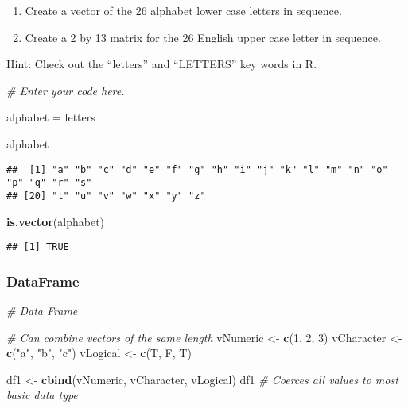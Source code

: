 \documentclass[
]{article}
\newenvironment{Shaded}{\begin{snugshade}}{\end{snugshade}}
\newcommand{\CommentTok}[1]{\textcolor[rgb]{0.56,0.35,0.01}{\textit{#1}}}
\newcommand{\DecValTok}[1]{\textcolor[rgb]{0.00,0.00,0.81}{#1}}
\newcommand{\FunctionTok}[1]{\textcolor[rgb]{0.13,0.29,0.53}{\textbf{#1}}}
\newcommand{\NormalTok}[1]{#1}
\newcommand{\OtherTok}[1]{\textcolor[rgb]{0.56,0.35,0.01}{#1}}
\newcommand{\StringTok}[1]{\textcolor[rgb]{0.31,0.60,0.02}{#1}}
\providecommand{\tightlist}{%
  \setlength{\itemsep}{0pt}\setlength{\parskip}{0pt}}
\begin{document}
\begin{enumerate}
\def\labelenumi{\arabic{enumi}.}
\tightlist
\item
  Create a vector of the 26 alphabet lower case letters in sequence.
\item
  Create a 2 by 13 matrix for the 26 English upper case letter in
  sequence.
\end{enumerate}

Hint: Check out the ``letters'' and ``LETTERS'' key words in R.

\begin{Shaded}
\begin{Highlighting}[]
\CommentTok{\# Enter your code here.}

\NormalTok{alphabet }\OtherTok{=}\NormalTok{ letters}

\NormalTok{alphabet}
\end{Highlighting}
\end{Shaded}

\begin{verbatim}
##  [1] "a" "b" "c" "d" "e" "f" "g" "h" "i" "j" "k" "l" "m" "n" "o" "p" "q" "r" "s"
## [20] "t" "u" "v" "w" "x" "y" "z"
\end{verbatim}

\begin{Shaded}
\begin{Highlighting}[]
\FunctionTok{is.vector}\NormalTok{(alphabet)}
\end{Highlighting}
\end{Shaded}

\begin{verbatim}
## [1] TRUE
\end{verbatim}

\subsubsection{DataFrame}\label{dataframe}

\begin{Shaded}
\begin{Highlighting}[]
\CommentTok{\# Data Frame}

\CommentTok{\# Can combine vectors of the same length}
\NormalTok{vNumeric   }\OtherTok{\textless{}{-}} \FunctionTok{c}\NormalTok{(}\DecValTok{1}\NormalTok{, }\DecValTok{2}\NormalTok{, }\DecValTok{3}\NormalTok{)}
\NormalTok{vCharacter }\OtherTok{\textless{}{-}} \FunctionTok{c}\NormalTok{(}\StringTok{"a"}\NormalTok{, }\StringTok{"b"}\NormalTok{, }\StringTok{"c"}\NormalTok{)}
\NormalTok{vLogical   }\OtherTok{\textless{}{-}} \FunctionTok{c}\NormalTok{(T, F, T)}

\NormalTok{df1 }\OtherTok{\textless{}{-}} \FunctionTok{cbind}\NormalTok{(vNumeric, vCharacter, vLogical)}
\NormalTok{df1  }\CommentTok{\# Coerces all values to most basic data type}
\end{Highlighting}
\end{Shaded}
\end{document}
